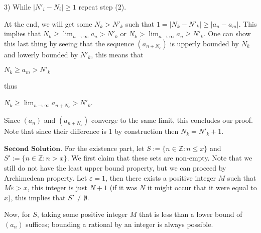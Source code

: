 \documentclass{article}
\theoremstyle{remark}
\begin{document}
\begin{enumerate}
        3) While $\vert N'_i - N_i \vert \geq 1$ repeat step (2).

        At the end, we will get some $N_k > N'_k$ such that $1 = \vert N_k - N'_k\vert \geq \vert a_n - a_m \vert$.
        This implies that $N_k \geq \lim_{n\to \infty }a_n > N'_k$ or $N_k > \lim_{n\to \infty }a_n \geq N'_k$.
        One can show this last thing by seeing that the sequence $(a_{n+N_{\varepsilon}})$ is upperly bounded by $N_k$ and lowerly bounded by $N'_{k}$,
        this means that
        \begin{center}
            $N_k \geq a_m > N'_k$
        \end{center}
        thus 
        \begin{center}
            $N_k \geq \lim_{n \to \infty}a_{n+N_{\varepsilon}} > N'_k$.
        \end{center}
        Since $(a_n)$ and $(a_{n+N_{\varepsilon}})$ converge to the same limit, this concludes our proof.
        Note that since their difference is 1 by construction then $N_k = N'_k + 1$.

        $\textbf{Second Solution.}$
        For the existence part, let $S := \{n \in \mathbb{Z}: n \leq x\}$ and
        $S' := \{n \in \mathbb{Z}: n > x\}$. 
        We first claim that these sets are non-empty. Note that we still do not have the least upper bound property, but we can
        proceed by Archimedean property. Let $\varepsilon = 1$, then there exists a positive integer $M$ such that $M\varepsilon > x$,
        this integer is just $N+1$ (if it was $N$ it might occur that it were equal to $x$), this implies that $S' \neq \emptyset$.
        
        Now, for $S$, taking some positive integer $M$ that is less than a lower bound of $(a_n)$ suffices; bounding a rational by an integer is always possible.


\end{enumerate}
\end{document}
